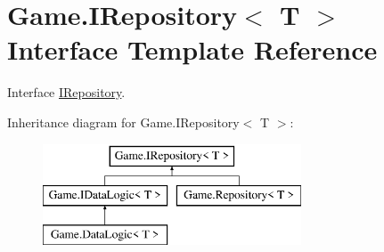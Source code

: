 \hypertarget{interface_game_1_1_i_repository}{}\section{Game.\+I\+Repository$<$ T $>$ Interface Template Reference}
\label{interface_game_1_1_i_repository}


Interface \mbox{\hyperlink{interface_game_1_1_i_repository}{I\+Repository}}.  


Inheritance diagram for Game.\+I\+Repository$<$ T $>$\+:\begin{figure}[H]
\begin{center}
\leavevmode
\includegraphics[height=3.000000cm]{interface_game_1_1_i_repository}
\end{center}
\end{figure}
